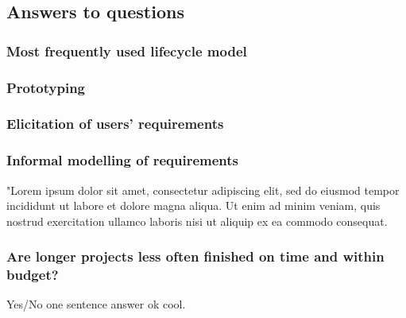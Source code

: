\documentclass[letterpaper,12pt]{article}
\begin{document}
\subsection{Answers to questions}
\subsubsection{Most frequently used lifecycle model}
\lipsum[66]
\subsubsection{Prototyping}
\lipsum[66]
\subsubsection{Elicitation of users' requirements}
\lipsum[75]
\subsubsection{Informal modelling of requirements}
"Lorem ipsum dolor sit amet, consectetur adipiscing elit, sed do eiusmod tempor incididunt ut labore et dolore magna aliqua. Ut enim ad minim veniam, quis nostrud exercitation ullamco laboris nisi ut aliquip ex ea commodo consequat.
\subsubsection{Are longer projects less often finished on time and within budget?}
Yes/No one sentence answer ok cool.
\end{document}
